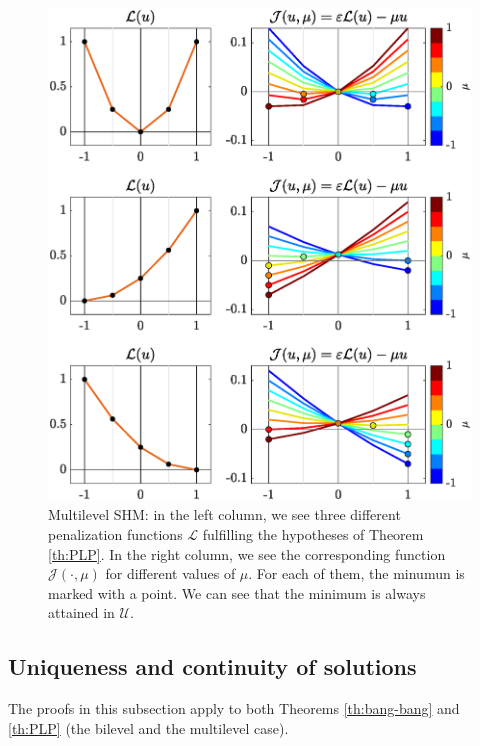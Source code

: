 \documentclass[twocolumn]{autart}    %
\begin{document}
\begin{figure}[h]
	\includegraphics[scale=0.35]{img/fig04.eps}
	\caption{Multilevel SHM: in the left column, we see three different penalization functions $\mathcal{L}$ fulfilling the hypotheses of Theorem \ref{th:PLP}. In the right column, we see the corresponding function $\mathcal{J}(\cdot,\mu)$ for different values of $\mu$. For each of them, the minumun is marked with a point.  We can see that the minimum is always attained in $\mathcal{U}$.} 
	\label{fig:several_hamiltonian}
\end{figure} 

\subsection{Uniqueness and continuity of solutions}\label{sec: uniqueness continuity}

The proofs in this subsection apply to both Theorems \ref{th:bang-bang} and \ref{th:PLP} (the bilevel and the multilevel case).
\end{document}

